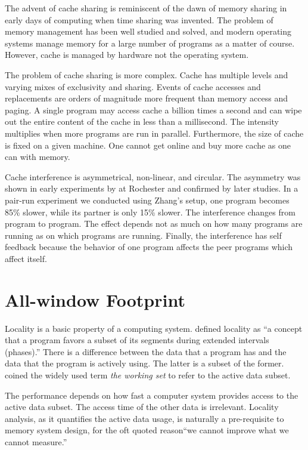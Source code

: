 The advent of cache sharing is reminiscent of the dawn of memory
sharing in early days of computing when time sharing was
invented.  The problem of memory management has been well studied
and solved, and modern operating systems manage memory for a large number of programs as a matter of course.
However, cache is managed by hardware not the operating system.

The problem of cache sharing is more complex.  Cache has multiple
levels and varying mixes of exclusivity and sharing.  Events of cache
accesses and replacements are orders of magnitude more frequent than memory
access and paging.  A single program may access cache a billion times
a second and can wipe out the entire content of the cache in less than
a millisecond.  The intensity multiplies when more programs are run
in parallel.  Furthermore, the size of cache is fixed on a given machine.
One cannot get online and buy more cache as one can with memory.

Cache interference is asymmetrical, non-linear, and circular.  The
asymmetry was shown in early experiments by \cite{Zhang+:EuroSys09} at
Rochester and confirmed by later studies.
In a pair-run experiment we conducted using Zhang's setup, one program
becomes 85\% slower, while its partner is only 15\% slower.  The
interference changes from program to program.  The effect depends not
as much on how many programs are running as on which programs are
running.  Finally, the interference has self feedback because the behavior of
one program affects the peer programs which affect itself.

\section{All-window Footprint}

Locality is a basic property of a computing system.  \cite{Denning:TSE80}
defined locality as ``a concept that a program favors a subset of its
segments during extended intervals (phases).'' 
There is a difference between the data that a program has
and the data that the program is actively using.  The latter is a
subset of the former.  \cite{Denning:CACM68} coined the widely used term \emph{the working set}
to refer to the active data subset.

The performance depends on how fast a computer system
provides access to the active data subset.  The access time of 
the other data is irrelevant.  
Locality analysis, as it
quantifies the active data usage, is naturally a pre-requisite to
memory system design, for the oft quoted reason``we cannot improve
what we cannot measure.''

